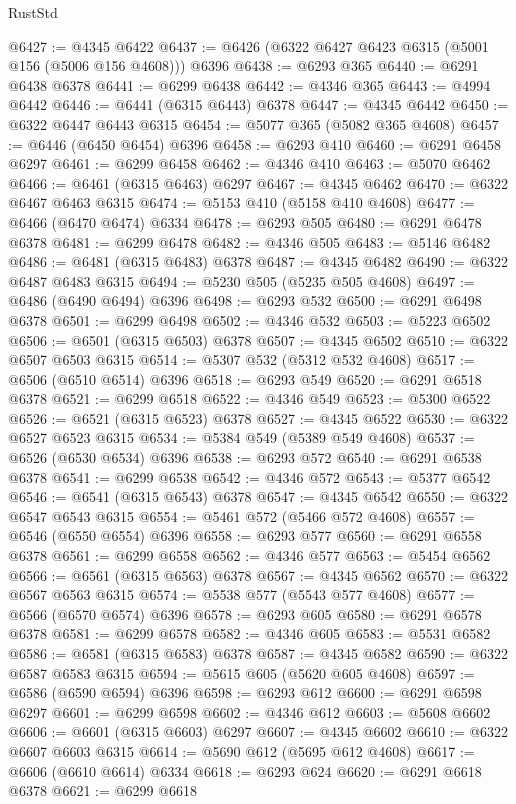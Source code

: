 \begin{lexlean}{RustStd}
\begin{coremodule}
@6427 := @4345 @6422
@6437 := @6426 (@6322 @6427 @6423 @6315 (@5001 @156 (@5006 @156 @4608))) @6396
@6438 := @6293 @365
@6440 := @6291 @6438 @6378
@6441 := @6299 @6438
@6442 := @4346 @365
@6443 := @4994 @6442
@6446 := @6441 (@6315 @6443) @6378
@6447 := @4345 @6442
@6450 := @6322 @6447 @6443 @6315
@6454 := @5077 @365 (@5082 @365 @4608)
@6457 := @6446 (@6450 @6454) @6396
@6458 := @6293 @410
@6460 := @6291 @6458 @6297
@6461 := @6299 @6458
@6462 := @4346 @410
@6463 := @5070 @6462
@6466 := @6461 (@6315 @6463) @6297
@6467 := @4345 @6462
@6470 := @6322 @6467 @6463 @6315
@6474 := @5153 @410 (@5158 @410 @4608)
@6477 := @6466 (@6470 @6474) @6334
@6478 := @6293 @505
@6480 := @6291 @6478 @6378
@6481 := @6299 @6478
@6482 := @4346 @505
@6483 := @5146 @6482
@6486 := @6481 (@6315 @6483) @6378
@6487 := @4345 @6482
@6490 := @6322 @6487 @6483 @6315
@6494 := @5230 @505 (@5235 @505 @4608)
@6497 := @6486 (@6490 @6494) @6396
@6498 := @6293 @532
@6500 := @6291 @6498 @6378
@6501 := @6299 @6498
@6502 := @4346 @532
@6503 := @5223 @6502
@6506 := @6501 (@6315 @6503) @6378
@6507 := @4345 @6502
@6510 := @6322 @6507 @6503 @6315
@6514 := @5307 @532 (@5312 @532 @4608)
@6517 := @6506 (@6510 @6514) @6396
@6518 := @6293 @549
@6520 := @6291 @6518 @6378
@6521 := @6299 @6518
@6522 := @4346 @549
@6523 := @5300 @6522
@6526 := @6521 (@6315 @6523) @6378
@6527 := @4345 @6522
@6530 := @6322 @6527 @6523 @6315
@6534 := @5384 @549 (@5389 @549 @4608)
@6537 := @6526 (@6530 @6534) @6396
@6538 := @6293 @572
@6540 := @6291 @6538 @6378
@6541 := @6299 @6538
@6542 := @4346 @572
@6543 := @5377 @6542
@6546 := @6541 (@6315 @6543) @6378
@6547 := @4345 @6542
@6550 := @6322 @6547 @6543 @6315
@6554 := @5461 @572 (@5466 @572 @4608)
@6557 := @6546 (@6550 @6554) @6396
@6558 := @6293 @577
@6560 := @6291 @6558 @6378
@6561 := @6299 @6558
@6562 := @4346 @577
@6563 := @5454 @6562
@6566 := @6561 (@6315 @6563) @6378
@6567 := @4345 @6562
@6570 := @6322 @6567 @6563 @6315
@6574 := @5538 @577 (@5543 @577 @4608)
@6577 := @6566 (@6570 @6574) @6396
@6578 := @6293 @605
@6580 := @6291 @6578 @6378
@6581 := @6299 @6578
@6582 := @4346 @605
@6583 := @5531 @6582
@6586 := @6581 (@6315 @6583) @6378
@6587 := @4345 @6582
@6590 := @6322 @6587 @6583 @6315
@6594 := @5615 @605 (@5620 @605 @4608)
@6597 := @6586 (@6590 @6594) @6396
@6598 := @6293 @612
@6600 := @6291 @6598 @6297
@6601 := @6299 @6598
@6602 := @4346 @612
@6603 := @5608 @6602
@6606 := @6601 (@6315 @6603) @6297
@6607 := @4345 @6602
@6610 := @6322 @6607 @6603 @6315
@6614 := @5690 @612 (@5695 @612 @4608)
@6617 := @6606 (@6610 @6614) @6334
@6618 := @6293 @624
@6620 := @6291 @6618 @6378
@6621 := @6299 @6618

\end{coremodule}
\end{lexlean}
